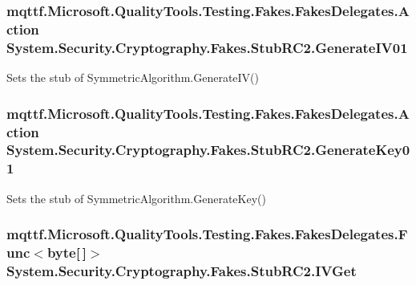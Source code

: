 \hypertarget{class_system_1_1_security_1_1_cryptography_1_1_fakes_1_1_stub_r_c2_a6e79e91c68e5865f344e18aa15ac9922}{
\subsubsection[{Generate\-I\-V01}]{\setlength{\rightskip}{0pt plus 5cm}mqttf.\-Microsoft.\-Quality\-Tools.\-Testing.\-Fakes.\-Fakes\-Delegates.\-Action System.\-Security.\-Cryptography.\-Fakes.\-Stub\-R\-C2.\-Generate\-I\-V01}}\label{class_system_1_1_security_1_1_cryptography_1_1_fakes_1_1_stub_r_c2_a6e79e91c68e5865f344e18aa15ac9922}


Sets the stub of Symmetric\-Algorithm.\-Generate\-I\-V()

\hypertarget{class_system_1_1_security_1_1_cryptography_1_1_fakes_1_1_stub_r_c2_a01373f4d76b4a842edf7512b8d32722c}{
\subsubsection[{Generate\-Key01}]{\setlength{\rightskip}{0pt plus 5cm}mqttf.\-Microsoft.\-Quality\-Tools.\-Testing.\-Fakes.\-Fakes\-Delegates.\-Action System.\-Security.\-Cryptography.\-Fakes.\-Stub\-R\-C2.\-Generate\-Key01}}\label{class_system_1_1_security_1_1_cryptography_1_1_fakes_1_1_stub_r_c2_a01373f4d76b4a842edf7512b8d32722c}


Sets the stub of Symmetric\-Algorithm.\-Generate\-Key()

\hypertarget{class_system_1_1_security_1_1_cryptography_1_1_fakes_1_1_stub_r_c2_a2bf5179dc3527b36b0da4087f4f6c5d6}{
\subsubsection[{I\-V\-Get}]{\setlength{\rightskip}{0pt plus 5cm}mqttf.\-Microsoft.\-Quality\-Tools.\-Testing.\-Fakes.\-Fakes\-Delegates.\-Func$<$byte\mbox{[}$\,$\mbox{]}$>$ System.\-Security.\-Cryptography.\-Fakes.\-Stub\-R\-C2.\-I\-V\-Get}}\label{class_system_1_1_security_1_1_cryptography_1_1_fakes_1_1_stub_r_c2_a2bf5179dc3527b36b0da4087f4f6c5d6}


